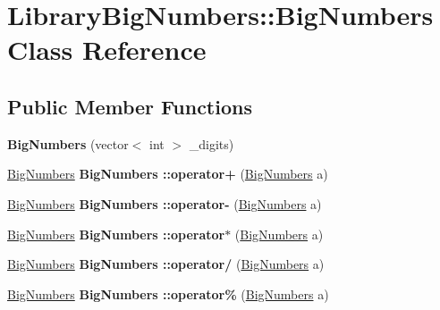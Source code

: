 \hypertarget{class_library_big_numbers_1_1_big_numbers}{}\section{Library\+Big\+Numbers\+:\+:Big\+Numbers Class Reference}
\label{class_library_big_numbers_1_1_big_numbers}
\subsection*{Public Member Functions}
\begin{DoxyCompactItemize}
\item 
\mbox{\label{class_library_big_numbers_1_1_big_numbers_ab7f8aed21b7c7d7a439c54518b61f931}} 
{\bfseries Big\+Numbers} (vector$<$ int $>$ \+\_\+digits)
\item 
\mbox{\label{class_library_big_numbers_1_1_big_numbers_ab654de80048eb9d507c69a3c8f55d4f5}} 
\mbox{\hyperlink{class_library_big_numbers_1_1_big_numbers}{Big\+Numbers}} {\bfseries Big\+Numbers \+::operator+} (\mbox{\hyperlink{class_library_big_numbers_1_1_big_numbers}{Big\+Numbers}} a)
\item 
\mbox{\label{class_library_big_numbers_1_1_big_numbers_a0be1b620dbaa2f05b41a1e1415d632d4}} 
\mbox{\hyperlink{class_library_big_numbers_1_1_big_numbers}{Big\+Numbers}} {\bfseries Big\+Numbers \+::operator-\/} (\mbox{\hyperlink{class_library_big_numbers_1_1_big_numbers}{Big\+Numbers}} a)
\item 
\mbox{\label{class_library_big_numbers_1_1_big_numbers_ac77d3baf4aebba44cc3d6b76a7550ac3}} 
\mbox{\hyperlink{class_library_big_numbers_1_1_big_numbers}{Big\+Numbers}} {\bfseries Big\+Numbers \+::operator$\ast$} (\mbox{\hyperlink{class_library_big_numbers_1_1_big_numbers}{Big\+Numbers}} a)
\item 
\mbox{\label{class_library_big_numbers_1_1_big_numbers_a85420d0c136afc0bdee74808b1813c38}} 
\mbox{\hyperlink{class_library_big_numbers_1_1_big_numbers}{Big\+Numbers}} {\bfseries Big\+Numbers \+::operator/} (\mbox{\hyperlink{class_library_big_numbers_1_1_big_numbers}{Big\+Numbers}} a)
\item 
\mbox{\label{class_library_big_numbers_1_1_big_numbers_a834e4be48581b2a473b863733f0beca3}} 
\mbox{\hyperlink{class_library_big_numbers_1_1_big_numbers}{Big\+Numbers}} {\bfseries Big\+Numbers \+::operator\%} (\mbox{\hyperlink{class_library_big_numbers_1_1_big_numbers}{Big\+Numbers}} a)
\end{DoxyCompactItemize}
